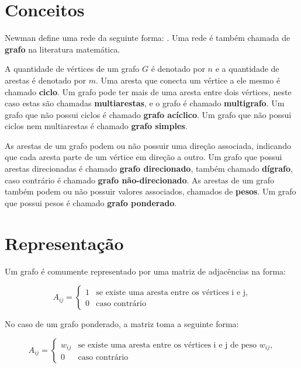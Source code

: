 
\section{Conceitos}

Newman \cite{newman:2018:networks} define uma rede da seguinte forma: .  Uma rede é também chamada de \textbf{grafo} na literatura matemática.

A quantidade de vértices de um grafo $G$ é denotado por $n$ e a quantidade de arestas é denotado por $m$. Uma aresta que conecta um vértice a ele mesmo é chamado \textbf{ciclo}. Um grafo pode ter mais de uma aresta entre dois vértices, neste caso estas são chamadas \textbf{multiarestas}, e o grafo é chamado \textbf{multigrafo}. Um grafo que não possui ciclos é chamado \textbf{grafo acíclico}. Um grafo que não possui ciclos nem multiarestas é chamado \textbf{grafo simples}.

As arestas de um grafo podem ou não possuir uma direção associada, indicando que cada aresta parte de um vértice em direção a outro. Um grafo que possui arestas direcionadas é chamado \textbf{grafo direcionado}, também chamado \textbf{dígrafo}, caso contrário é chamado \textbf{grafo não-direcionado}. As arestas de um grafo também podem ou não possuir valores associados, chamados de \textbf{pesos}. Um grafo que possui pesos é chamado \textbf{grafo ponderado}.

\section{Representação}

Um grafo é comumente representado por uma matriz de adjacências na forma:

\begin{equation}
A_{ij} = \begin{cases}
1 & \mbox{se existe uma aresta entre os vértices i e j,}\\
0 & \mbox{caso contrário}
\end{cases}
\end{equation}

No caso de um grafo ponderado, a matriz toma a seguinte forma:

\begin{equation}
A_{ij} = \begin{cases}
w_{ij} & \mbox{se existe uma aresta entre os vértices i e j de peso $w_{ij}$,}\\
0 & \mbox{caso contrário}
\end{cases}
\end{equation}

